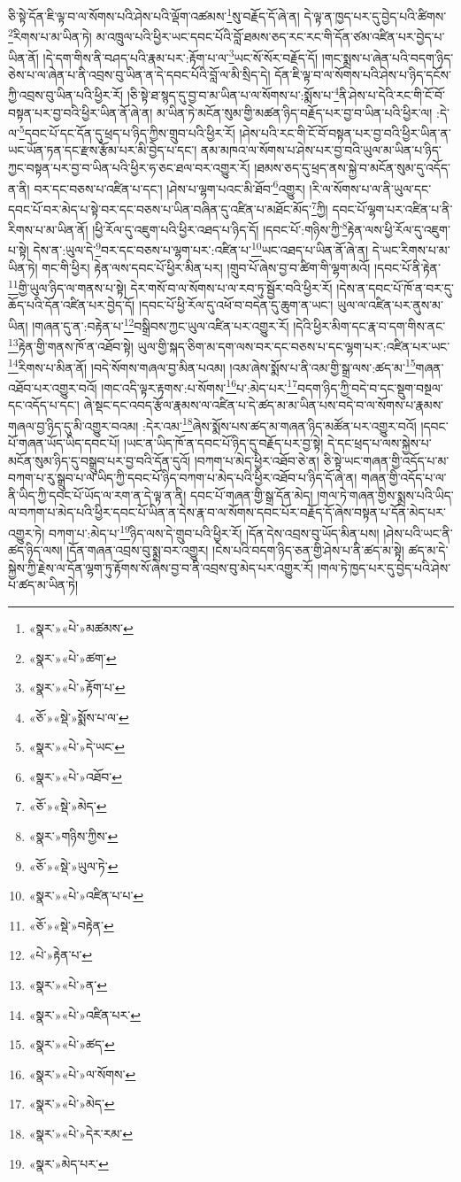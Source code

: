 ཅི་སྟེ་དོན་ཇི་ལྟ་བ་ལ་སོགས་པའི་ཤེས་པའི་ལྡོག་འཚམས་\footnote{«སྣར་»«པེ་»མཚམས་}སུ་བརྗོད་དོ་ཞེ་ན། དེ་ལྟ་ན་ཁྱད་པར་དུ་བྱེད་པའི་ཚིགས་\footnote{«སྣར་»«པེ་»ཚག་}རིགས་པ་མ་ཡིན་ཏེ། མ་འཁྲུལ་པའི་ཕྱིར་ཡང་དབང་པོའི་བློ་ཐམས་ཅད་རང་རང་གི་དོན་ཙམ་འཛིན་པར་བྱེད་པ་ཡིན་ནོ། །དེ་དག་གིས་ནི་བཤད་པའི་རྣམ་པར་:རྟོག་པ་ལ་\footnote{«སྣར་»«པེ་»རྟོག་པ་}ཡང་སོ་སོར་བརྗོད་དོ། །གང་སྨྲས་པ་ཞེན་པའི་བདག་ཉིད་ཅེས་པ་ལ་ཞེན་པ་ནི་འབྲས་བུ་ཡིན་ན་དེ་དབང་པོའི་བློ་ལ་མི་སྲིད་དེ། དོན་ཇི་ལྟ་བ་ལ་སོགས་པའི་ཤེས་པ་ཉིད་དངོས་ཀྱི་འབྲས་བུ་ཡིན་པའི་ཕྱིར་རོ། །ཅི་སྟེ་ཐ་སྙད་དུ་བྱ་བ་མ་ཡིན་པ་ལ་སོགས་པ་:སྨོས་པ་\footnote{«ཅོ་»«སྡེ་»སྨོས་པ་ལ་}ནི་ཤེས་པ་དེའི་རང་གི་ངོ་བོ་བསྟན་པར་བྱ་བའི་ཕྱིར་ཡིན་ནོ་ཞེ་ན། མ་ཡིན་ཏེ་མངོན་སུམ་གྱི་མཚན་ཉིད་བརྗོད་པར་བྱ་བ་ཡིན་པའི་ཕྱིར་ལ། :དེ་ལ་\footnote{«སྣར་»«པེ་»དེ་ཡང་}དབང་པོ་དང་དོན་དུ་ཕྲད་པ་ཉིད་ཀྱིས་གྲུབ་པའི་ཕྱིར་རོ། །ཤེས་པའི་རང་གི་ངོ་བོ་བསྟན་པར་བྱ་བའི་ཕྱིར་ཡིན་ན་ཡང་ཡོན་ཏན་དང་རྫས་རྩོམ་པར་མི་བྱེད་པ་དང་། ནམ་མཁའ་ལ་སོགས་པ་ཤེས་པར་བྱ་བའི་ཡུལ་མ་ཡིན་པ་ཉིད་ཀྱང་བསྟན་པར་བྱ་བ་ཡིན་པའི་ཕྱིར་ཧ་ཅང་ཐལ་བར་འགྱུར་རོ། །ཐམས་ཅད་དུ་ཕྲད་ནས་སྐྱེ་བ་མངོན་སུམ་དུ་འདོད་ན་ནི། བར་དང་བཅས་པ་འཛིན་པ་དང་། །ཤེས་པ་ལྷག་པའང་མི་ཐོབ་\footnote{«སྣར་»«པེ་»འཐོབ་}འགྱུར། །རི་ལ་སོགས་པ་ལ་ནི་ཡུལ་དང་དབང་པོ་བར་མེད་པ་སྟེ་བར་དང་བཅས་པ་ཡིན་བཞིན་དུ་འཛིན་པ་མཐོང་མོད་\footnote{«ཅོ་»«སྡེ་»མེད་}ཀྱི། དབང་པོ་ལྷག་པར་འཛིན་པ་ནི་རིགས་པ་མ་ཡིན་ནོ། །ཕྱི་རོལ་དུ་འཇུག་པའི་ཕྱིར་འཐད་པ་ཉིད་དོ། །དབང་པོ་:གཉིས་ཀྱི་\footnote{«སྣར་»གཉིས་ཀྱིས་}རྟེན་ལས་ཕྱི་རོལ་དུ་འཇུག་པ་སྟེ། དེས་ན་:ཡུལ་དེ་\footnote{«ཅོ་»«སྡེ་»ཡུལ་ཏེ་}བར་དང་བཅས་པ་ལྷག་པར་:འཛིན་པ་\footnote{«སྣར་»«པེ་»འཛིན་པ་པ་}ཡང་འཐད་པ་ཡིན་ནོ་ཞེ་ན། དེ་ཡང་རིགས་པ་མ་ཡིན་ཏེ། གང་གི་ཕྱིར། རྟེན་ལས་དབང་པོ་ཕྱིར་མིན་པར། །གྲུབ་པོ་ཞེས་བྱ་བ་ཚིག་གི་ལྷག་མའོ། །དབང་པོ་ནི་རྟེན་\footnote{«ཅོ་»«སྡེ་»བརྟེན་}གྱི་ཡུལ་ཉིད་ལ་གནས་པ་སྟེ། དེར་གསོ་བ་ལ་སོགས་པ་ལ་རབ་ཏུ་སྦྱོར་བའི་ཕྱིར་རོ། །དེས་ན་དབང་པོ་ཁོ་ན་བར་དུ་ཆོད་པའི་དོན་འཛིན་པར་བྱེད་དོ། །དབང་པོ་ཕྱི་རོལ་དུ་འཕོ་བ་བདེན་དུ་ཆུག་ན་ཡང་། ཡུལ་ལ་འཛིན་པར་ནུས་མ་ཡིན། །གཞན་དུ་ན་:བརྟེན་པ་\footnote{«པེ་»རྟེན་པ་}བསྒྲིབས་ཀྱང་ཡུལ་འཛིན་པར་འགྱུར་རོ། །དེའི་ཕྱིར་མིག་དང་རྣ་བ་དག་གིས་ནང་\footnote{«སྣར་»«པེ་»ན་}རྟེན་གྱི་གནས་ཁོ་ན་འཐོབ་སྟེ། ཡུལ་གྱི་སྐད་ཅིག་མ་དག་ལས་བར་དང་བཅས་པ་དང་ལྷག་པར་:འཛིན་པར་ཡང་\footnote{«སྣར་»«པེ་»འཛིན་པར་}རིགས་པ་མིན་ནོ། །བདེ་སོགས་གཞལ་བྱ་མིན་པའམ། །འམ་ཞེས་སྨོས་པ་ནི་འམ་གྱི་སྒྲ་ལས་:ཚད་མ་\footnote{«སྣར་»«པེ་»ཚད་}གཞན་འཐོབ་པར་འགྱུར་བའོ། །གང་འདི་ལྟར་རྟགས་:པ་སོགས་\footnote{«སྣར་»«པེ་»ལ་སོགས་}པ་:མེད་པར་\footnote{«སྣར་»«པེ་»མེད་}བདག་ཉིད་ཀྱི་བདེ་བ་དང་སྡུག་བསྔལ་དང་འདོད་པ་དང་། ཞེ་སྡང་དང་འབད་རྩོལ་རྣམས་ལ་འཛིན་པ་དེ་ཚད་མ་མ་ཡིན་པས་བདེ་བ་ལ་སོགས་པ་རྣམས་གཞལ་བྱ་ཉིད་དུ་མི་འགྱུར་བའམ། :དེར་འམ་\footnote{«སྣར་»«པེ་»དེར་རམ་}ཞེས་སྨོས་པས་ཚད་མ་གཞན་ཉིད་མཚོན་པར་འགྱུར་བའོ། །དབང་པོ་གཞན་ཡོད་ཡིད་དབང་པོ། །ཡང་ན་ཡིད་ཁོ་ན་དབང་པོ་ཉིད་དུ་བརྗོད་པར་བྱ་སྟེ། དེ་དང་ཕྲད་པ་ལས་སྐྱེས་པ་མངོན་སུམ་ཉིད་དུ་བསྒྲུབ་པར་བྱ་བའི་དོན་དུའོ། །བཀག་པ་མེད་ཕྱིར་འཐོབ་ཅེ་ན། ཅི་སྟེ་ཡང་གཞན་གྱི་འདོད་པ་མ་བཀག་པ་རུ་སྒྲུབ་པ་ལ་ཡིད་ཀྱི་དབང་པོ་ཉིད་བཀག་པ་མེད་པའི་ཕྱིར་འཐོབ་པ་ཉིད་དོ་ཞེ་ན། གཞན་གྱི་འདོད་པ་ལ་ནི་ཡིད་ཀྱི་དབང་པོ་ཡོད་ལ་རག་ན་དེ་ལྟ་ན་ནི། དབང་པོ་གཞན་གྱི་སྒྲ་དོན་མེད། །གལ་ཏེ་གཞན་གྱིས་སྨྲས་པའི་ཡིད་ལ་བཀག་པ་མེད་པའི་ཕྱིར་དབང་པོ་ཡིན་ན་དེས་རྣ་བ་ལ་སོགས་དབང་པོར་བརྗོད་དོ་ཞེས་བསྟན་པ་དོན་མེད་པར་འགྱུར་ཏེ། བཀག་པ་:མེད་པ་\footnote{«སྣར་»མེད་པར་}ཉིད་ལས་དེ་གྲུབ་པའི་ཕྱིར་རོ། །དོན་དེས་འབྲས་བུ་ཡོད་མིན་པས། །ཤེས་པའི་ཡང་ནི་ཚད་ཉིད་ལས། །དོན་གཞན་འབྲས་བུ་སྨྲ་བར་འགྱུར། །ངེས་པའི་བདག་ཉིད་ཅན་གྱི་ཤེས་པ་ནི་ཚད་མ་སྟེ། ཚད་མ་དེ་སྐྱེས་ཀྱི་རྗེས་ལ་དོན་ལྷག་ཏུ་རྟོགས་སོ་ཞེས་བྱ་བ་ནི་འབྲས་བུ་མེད་པར་འགྱུར་རོ། །གལ་ཏེ་ཁྱད་པར་དུ་བྱེད་པའི་ཤེས་པ་ཚད་མ་ཡིན་ཏེ། 